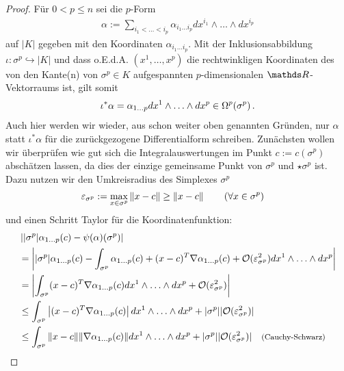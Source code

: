   \begin{proof}
    Für \( 0 < p \le n \) sei die \( p \)-Form 
    \begin{align}
      \alpha := \sum_{i_{1}<\ldots<i_{p}} \alpha_{i_{1}\ldots i_{p}} dx^{i_{1}}\wedge\ldots\wedge dx^{i_{p}}
    \end{align}
    auf \( |K| \) gegeben mit den Koordinaten \(\alpha_{i_{1}\ldots i_{p}} \). 
    Mit der Inklusionsabbildung \( \iota: \sigma^{p} \hookrightarrow |K| \) und dass o.E.d.A. \( \left( x^{1},\ldots,x^{p} \right) \) die rechtwinkligen Koordinaten des von
    den Kante(n) von
    \( \sigma^{p}\in K \) aufgespannten \( p\)-dimensionalen \( \R \)-Vektorraums ist, gilt somit
    \begin{align}
      \iota^{*}\alpha = \alpha_{1\ldots p}dx^{1}\wedge\ldots\wedge dx^{p}\in\Omega^{p}(\sigma^{p}) \,\text{.}
    \end{align}
    Auch hier werden wir wieder, aus schon weiter oben genannten Gründen, nur \( \alpha \) statt \( \iota^{*}\alpha \) für die zurückgezogene Differentialform schreiben.
    Zunächsten wollen wir überprüfen wie gut sich die Integralauswertungen im Punkt \( c:=c(\sigma^{p}) \) abschätzen lassen, da dies der einzige gemeinsame Punkt von
    \( \sigma^{p} \) und \( \star\sigma^{p} \) ist.
    Dazu nutzen wir den Umkreisradius des Simplexes  \( \sigma^{p} \)
    \begin{align}
      \varepsilon_{\sigma^{p}} &:= \max_{x\in\sigma^{p}}\|x-c\| \ge \|x-c\| \qquad\left( \forall x \in \sigma^{p} \right)
    \end{align}
    und einen Schritt Taylor für die Koordinatenfunktion:
    \begin{align}
      &\left| |\sigma^{p}|\alpha_{1 \ldots p}(c) - \psi(\alpha)(\sigma^{p})\right| \\
      &=  \left| |\sigma^{p}|\alpha_{1 \ldots p}(c) 
                  - \int_{\sigma^{p}} \alpha_{1 \ldots p}(c) + (x-c)^{T}\nabla\alpha_{1 \ldots p}(c) + \mathcal{O}(\eps_{\sigma^{p}}^{2}) dx^{1}\wedge\ldots\wedge dx^{p} \right| \\
      &= \left| \int_{\sigma^{p}}  (x-c)^{T}\nabla\alpha_{1 \ldots p}(c) dx^{1}\wedge\ldots\wedge dx^{p} + \mathcal{O}(\eps_{\sigma^{p}}^{2})\right| \\
      &\le \int_{\sigma^{p}} \left| (x-c)^{T}\nabla\alpha_{1 \ldots p}(c) \right| dx^{1}\wedge\ldots\wedge dx^{p} +|\sigma^{p}| |\mathcal{O}(\eps_{\sigma^{p}}^{2})| \\
      &\le \int_{\sigma^{p}} \|x-c\|\|\nabla\alpha_{1 \ldots p}(c)\| dx^{1}\wedge\ldots\wedge dx^{p} +|\sigma^{p}| |\mathcal{O}(\eps_{\sigma^{p}}^{2})| \formtext{\footnotesize(Cauchy-Schwarz)}\\

\end{align}
\end{proof}
